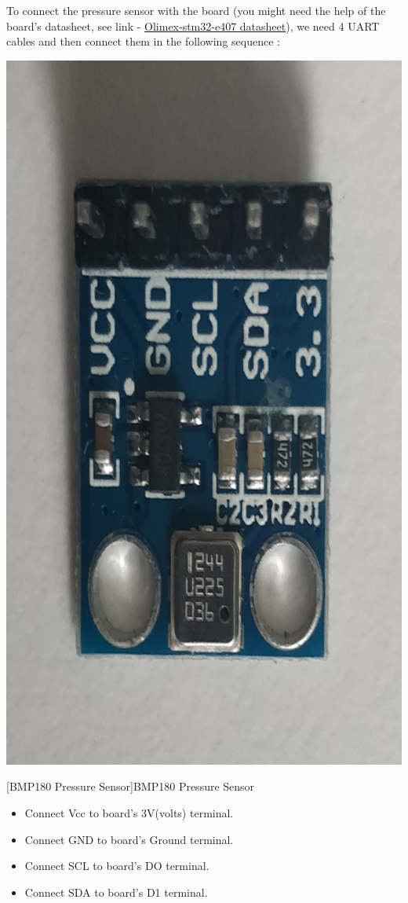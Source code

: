 \documentclass[%
xelatex,
	oneside,		%
	12pt,			%
	parskip=half,	%
	abstracton,
	chapterprefix=true%
    appendixprefix=true]
{scrbook}
\begin{document}
\begin{enumerate}
To connect the pressure sensor with the board (you might need the help of the board's datasheet, see link - \href{https://www.olimex.com/Products/ARM/ST/STM32-E407/resources/STM32-E407.pdf}{Olimex-stm32-e407 datasheet}\cite{olimexdatasheet}), we need 4 UART cables and then connect them in the following sequence :
				\begin{center}
\includegraphics[scale=0.03,angle=270]{fig/pressuresensor.jpg}

[BMP180 Pressure Sensor]{BMP180 Pressure Sensor}
\label{fig:bmp180}
\end{center}
\begin{itemize}
\item Connect Vcc to board's 3V(volts) terminal.
\item Connect GND to board's Ground terminal.
\item Connect SCL to board's DO terminal.
\item Connect SDA to board's D1 terminal.
\end{itemize}


\end{enumerate}
\end{document}
